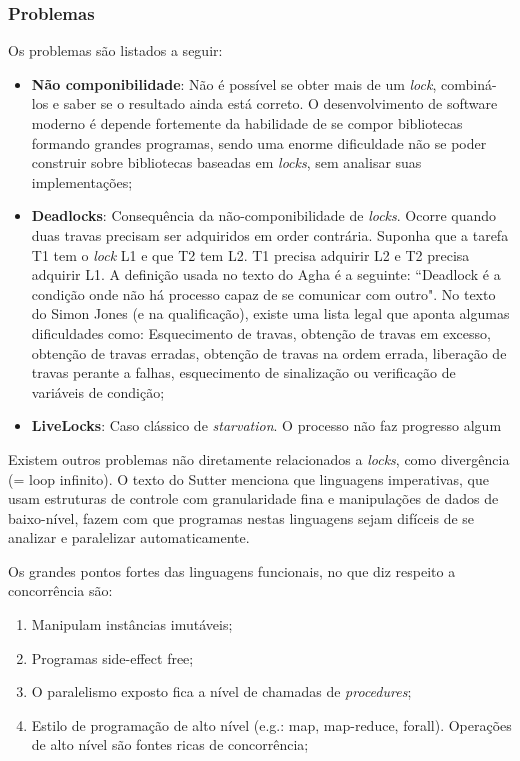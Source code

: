 \documentclass[]{article}
\begin{document}
	\subsubsection{Problemas}
		\par Os problemas são listados a seguir:
		\begin{itemize}
			\item \textbf{Não componibilidade}: Não é possível se obter mais de um \textit{lock}, combiná-los e saber
			se o resultado ainda está correto. O desenvolvimento de software moderno é depende fortemente da habilidade
			de se compor bibliotecas formando grandes programas, sendo uma enorme dificuldade não se poder construir
			sobre bibliotecas baseadas em \textit{locks}, sem analisar suas implementações;

			\item \textbf{Deadlocks}: Consequência da não-componibilidade de \textit{locks}. Ocorre quando duas travas
			precisam ser adquiridos em order contrária. Suponha que a tarefa T1 tem o \textit{lock} L1 e que T2 tem L2. 
			T1 precisa adquirir L2 e T2 precisa adquirir L1. A definição usada no texto do Agha é a seguinte: 
			``Deadlock é a condição onde não há processo capaz de se comunicar com outro". No texto do Simon Jones (e na
			qualificação), existe uma lista legal que aponta algumas dificuldades como: Esquecimento de travas,
			obtenção de travas em excesso, obtenção de travas erradas, obtenção de travas na ordem errada, liberação de
			travas perante a falhas, esquecimento de sinalização ou verificação de variáveis de condição;
			
			\item \textbf{LiveLocks}: Caso clássico de \textit{starvation}. O processo não faz progresso algum	
					
		\end{itemize}
	
		\par Existem outros problemas não diretamente relacionados a \textit{locks}, como divergência (= loop infinito).
		O texto do Sutter menciona que linguagens imperativas, que usam estruturas de controle com granularidade fina e
		manipulações de dados de baixo-nível, fazem com que programas nestas linguagens sejam difíceis de se analizar
		e paralelizar automaticamente.\\

		\par Os grandes pontos fortes das linguagens funcionais, no que diz respeito a concorrência são:
		\begin{enumerate}
			\item Manipulam instâncias imutáveis;
			\item Programas side-effect free;
			\item O paralelismo exposto fica a nível de chamadas de \textit{procedures};
			\item Estilo de programação de alto nível (e.g.: map, map-reduce, forall). Operações de alto nível são
			fontes ricas de concorrência;
		\end{enumerate}
		
\end{document}
